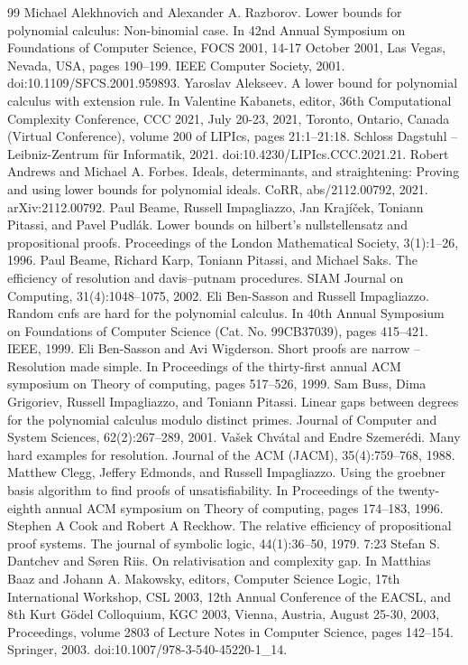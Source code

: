 \begin{thebibliography}{99}
 Michael Alekhnovich and Alexander A. Razborov. Lower bounds for polynomial calculus: Non-binomial case. In 42nd Annual Symposium on Foundations of Computer Science, FOCS 2001, 14-17 October 2001, Las Vegas, Nevada, USA, pages 190–199. IEEE Computer Society, 2001. doi:10.1109/SFCS.2001.959893.
 Yaroslav Alekseev. A lower bound for polynomial calculus with extension rule. In Valentine Kabanets, editor, 36th Computational Complexity Conference, CCC 2021, July 20-23, 2021, Toronto, Ontario, Canada (Virtual Conference), volume 200 of LIPIcs, pages 21:1–21:18. Schloss Dagstuhl – Leibniz-Zentrum für Informatik, 2021. doi:10.4230/LIPIcs.CCC.2021.21.
 Robert Andrews and Michael A. Forbes. Ideals, determinants, and straightening: Proving and using lower bounds for polynomial ideals. CoRR, abs/2112.00792, 2021. arXiv:2112.00792.
 Paul Beame, Russell Impagliazzo, Jan Krajíček, Toniann Pitassi, and Pavel Pudlák. Lower bounds on hilbert’s nullstellensatz and propositional proofs. Proceedings of the London Mathematical Society, 3(1):1–26, 1996.
 Paul Beame, Richard Karp, Toniann Pitassi, and Michael Saks. The efficiency of resolution and davis–putnam procedures. SIAM Journal on Computing, 31(4):1048–1075, 2002.
 Eli Ben-Sasson and Russell Impagliazzo. Random cnfs are hard for the polynomial calculus. In 40th Annual Symposium on Foundations of Computer Science (Cat. No. 99CB37039), pages 415–421. IEEE, 1999.
 Eli Ben-Sasson and Avi Wigderson. Short proofs are narrow – Resolution made simple. In Proceedings of the thirty-first annual ACM symposium on Theory of computing, pages 517–526, 1999.
 Sam Buss, Dima Grigoriev, Russell Impagliazzo, and Toniann Pitassi. Linear gaps between degrees for the polynomial calculus modulo distinct primes. Journal of Computer and System Sciences, 62(2):267–289, 2001.
 Vašek Chvátal and Endre Szemerédi. Many hard examples for resolution. Journal of the ACM (JACM), 35(4):759–768, 1988.
 Matthew Clegg, Jeffery Edmonds, and Russell Impagliazzo. Using the groebner basis algorithm to find proofs of unsatisfiability. In Proceedings of the twenty-eighth annual ACM symposium on Theory of computing, pages 174–183, 1996.
 Stephen A Cook and Robert A Reckhow. The relative efficiency of propositional proof systems. The journal of symbolic logic, 44(1):36–50, 1979. 7:23
 Stefan S. Dantchev and Søren Riis. On relativisation and complexity gap. In Matthias Baaz and Johann A. Makowsky, editors, Computer Science Logic, 17th International Workshop, CSL 2003, 12th Annual Conference of the EACSL, and 8th Kurt Gödel Colloquium, KGC 2003, Vienna, Austria, August 25-30, 2003, Proceedings, volume 2803 of Lecture Notes in Computer Science, pages 142–154. Springer, 2003. doi:10.1007/978-3-540-45220-1\_14.

\end{thebibliography}
